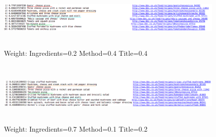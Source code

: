 \documentclass[oneside]{article}			%
\begin{document}
\begin{itemize}
\begin{figure}[h]
			\includegraphics[width=18cm, height=3.1cm]{./report_file/img/4_4_2_ex.png}\caption{Weight: Ingredients=0.2 Method=0.4 Title=0.4}
		\end{figure}
		\begin{figure}[h]
			\includegraphics[width=18cm, height=3.1cm]{./report_file/img/4_4_3_ex.png}\caption{Weight: Ingredients=0.7 Method=0.1 Title=0.2}
		\end{figure}
	\end{itemize}

	\clearpage
\end{document}
